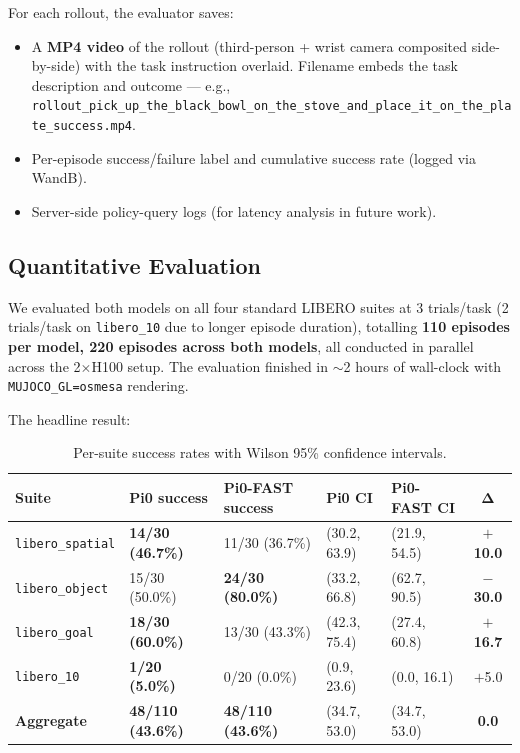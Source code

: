 \documentclass[11pt,letterpaper]{article}
\begin{document}
For each rollout, the evaluator saves:
\begin{itemize}[noitemsep,topsep=2pt]
  \item A \textbf{MP4 video} of the rollout (third-person + wrist camera composited side-by-side) with the task instruction overlaid. Filename embeds the task description and outcome --- e.g., \texttt{rollout\_pick\_up\_the\_black\_bowl\_on\_the\_stove\_and\_place\_it\_on\_the\_plate\_success.mp4}.
  \item Per-episode success/failure label and cumulative success rate (logged via WandB).
  \item Server-side policy-query logs (for latency analysis in future work).
\end{itemize}

\subsection*{Quantitative Evaluation}

We evaluated both models on all four standard LIBERO suites at 3 trials/task (2 trials/task on \texttt{libero\_10} due to longer episode duration), totalling \textbf{110 episodes per model, 220 episodes across both models}, all conducted in parallel across the 2$\times$H100 setup. The evaluation finished in $\sim$2 hours of wall-clock with \texttt{MUJOCO\_GL=osmesa} rendering.

The headline result:

\begin{table}[h]
\centering
\small
\caption{Per-suite success rates with Wilson 95\% confidence intervals.}
\label{tab:headline}
\begin{tabular}{lllllc}
\toprule
\textbf{Suite} & \textbf{Pi0 success} & \textbf{Pi0-FAST success} & \textbf{Pi0 CI} & \textbf{Pi0-FAST CI} & $\boldsymbol{\Delta}$ \\
\midrule
\texttt{libero\_spatial} & \textbf{14/30 (46.7\%)} & 11/30 (36.7\%) & (30.2, 63.9) & (21.9, 54.5) & \textbf{$+$10.0} \\
\texttt{libero\_object}  & 15/30 (50.0\%) & \textbf{24/30 (80.0\%)} & (33.2, 66.8) & (62.7, 90.5) & \textbf{$-$30.0} \\
\texttt{libero\_goal}    & \textbf{18/30 (60.0\%)} & 13/30 (43.3\%) & (42.3, 75.4) & (27.4, 60.8) & \textbf{$+$16.7} \\
\texttt{libero\_10}      & \textbf{1/20 (5.0\%)} & 0/20 (0.0\%) & (0.9, 23.6) & (0.0, 16.1) & $+$5.0 \\
\midrule
\textbf{Aggregate}       & \textbf{48/110 (43.6\%)} & \textbf{48/110 (43.6\%)} & (34.7, 53.0) & (34.7, 53.0) & \textbf{0.0} \\
\bottomrule
\end{tabular}
\end{table}
\end{document}
